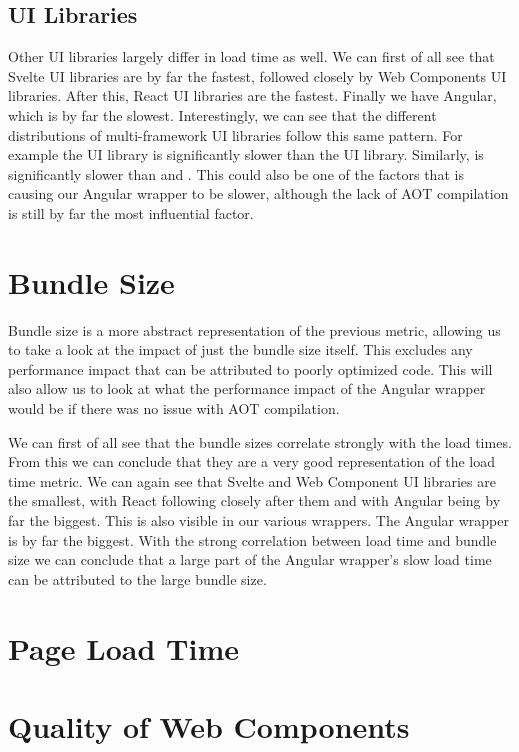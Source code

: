 \subsection{UI Libraries}
Other UI libraries largely differ in load time as well. We can first of all see that Svelte UI libraries are by far the fastest, followed closely by Web Components UI libraries. After this, React UI libraries are the fastest. Finally we have Angular, which is by far the slowest. Interestingly, we can see that the different distributions of multi-framework UI libraries follow this same pattern. For example the  UI library is significantly slower than the  UI library. Similarly,  is significantly slower than  and . This could also be one of the factors that is causing our Angular wrapper to be slower, although the lack of AOT compilation is still by far the most influential factor.

\section{Bundle Size}
Bundle size is a more abstract representation of the previous metric, allowing us to take a look at the impact of just the bundle size itself. This excludes any performance impact that can be attributed to poorly optimized code. This will also allow us to look at what the performance impact of the Angular wrapper would be if there was no issue with AOT compilation.

We can first of all see that the bundle sizes correlate strongly with the load times. From this we can conclude that they are a very good representation of the load time metric. We can again see that Svelte and Web Component UI libraries are the smallest, with React following closely after them and with Angular being by far the biggest. This is also visible in our various wrappers. The Angular wrapper is by far the biggest. With the strong correlation between load time and bundle size we can conclude that a large part of the Angular wrapper's slow load time can be attributed to the large bundle size.

\section{Page Load Time}


\section{Quality of Web Components}

